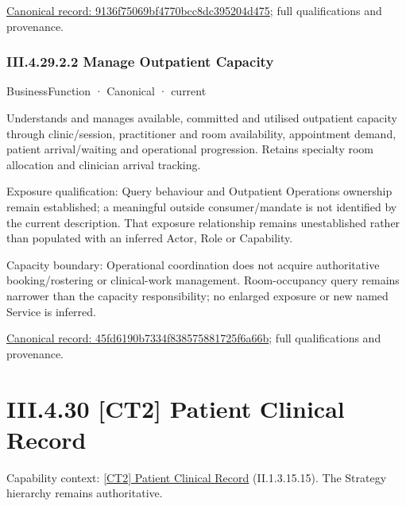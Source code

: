 {\footnotesize \href{../../../../continuum/business/business-function/9136f75069bf4770bcc8dc395204d475.md}{Canonical record: 9136f75069bf4770bcc8dc395204d475}; full qualifications and provenance.}\par
\subsubsection*{III.4.29.2.2 Manage Outpatient Capacity}
\label{navigation:III.4.29.2.2}

\label{element:45fd6190b7334f838575881725f6a66b}
{\small BusinessFunction · Canonical · current}\par

Understands and manages available, committed and utilised outpatient capacity through clinic/session, practitioner and room availability, appointment demand, patient arrival/waiting and operational progression. Retains specialty room allocation and clinician arrival tracking.



Exposure qualification: Query behaviour and Outpatient Operations ownership remain established; a meaningful outside consumer/mandate is not identified by the current description. That exposure relationship remains unestablished rather than populated with an inferred Actor, Role or Capability.



Capacity boundary: Operational coordination does not acquire authoritative booking/rostering or clinical-work management. Room-occupancy query remains narrower than the capacity responsibility; no enlarged exposure or new named Service is inferred.


{\footnotesize \href{../../../../continuum/business/business-function/45fd6190b7334f838575881725f6a66b.md}{Canonical record: 45fd6190b7334f838575881725f6a66b}; full qualifications and provenance.}\par
\section*{III.4.30 [CT2] Patient Clinical Record}
\label{navigation:III.4.30}

{\small Capability context: \hyperref[element:5478878e0e6e4d34a8d5023ac6ac2d54]{[CT2] Patient Clinical Record} (II.1.3.15.15). The Strategy hierarchy remains authoritative.}\par
